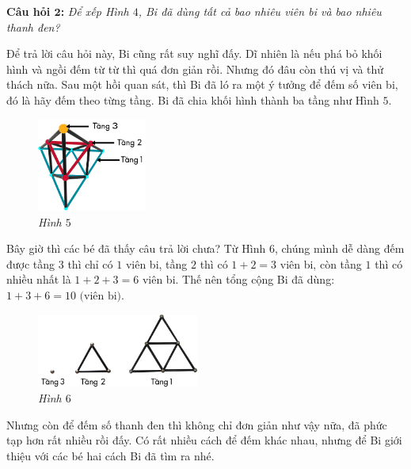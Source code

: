 	\vspace*{-5pt}
	\textbf{\color{toancuabi}Câu hỏi $\pmb{2}$:} \textit{Để xếp Hình $4$, Bi đã dùng tất cả bao nhiêu viên bi và bao nhiêu thanh đen?}
	\vspace*{-5pt}
	\begin{multicols}{2}
		Để trả lời câu hỏi này, Bi cũng rất suy nghĩ đấy. Dĩ nhiên là nếu phá bỏ khối hình và ngồi đếm từ từ thì quá đơn giản rồi. Nhưng đó đâu còn thú vị và thử thách nữa. Sau một hồi quan sát, thì Bi đã ló ra một ý tưởng để đếm số viên bi, đó là hãy đếm theo từng tầng. Bi đã chia khối hình thành ba tầng như Hình $5$.
		\begin{figure}[H]
			\centering
			\vspace*{-5pt}
			\captionsetup{labelformat= empty, justification=centering} \includegraphics[width=0.32\textwidth]{5}
			
			\vspace*{-10pt}
			\caption{\small\textit{Hình $5$}}
			\vspace*{-5pt}
		\end{figure}
	\end{multicols}
	Bây giờ thì các bé đã thấy câu trả lời chưa? Từ  Hình $6$, chúng mình dễ dàng đếm được tầng $3$ thì chỉ có $1$ viên bi, tầng $2$ thì có $1+2 = 3$ viên bi, còn tầng $1$ thì có nhiều nhất là $1 + 2 + 3 = 6$ viên bi. Thế nên tổng cộng Bi đã dùng:
	$1 + 3 + 6 = 10 \text{ (viên bi)}.$
	\begin{multicols}{2}
		\begin{figure}[H]
			\centering
			\vspace*{15pt}
			\captionsetup{labelformat= empty, justification=centering} \includegraphics[width=0.475\textwidth]{6}
			\caption{\small\textit{Hình $6$}}
			\vspace*{-5pt}
		\end{figure}
		Nhưng còn để đếm số thanh đen thì không chỉ đơn giản như vậy nữa, đã phức tạp hơn rất nhiều rồi đấy. Có rất nhiều cách để đếm khác nhau, nhưng để Bi giới thiệu với các bé hai cách Bi đã tìm ra nhé.
	\end{multicols}
